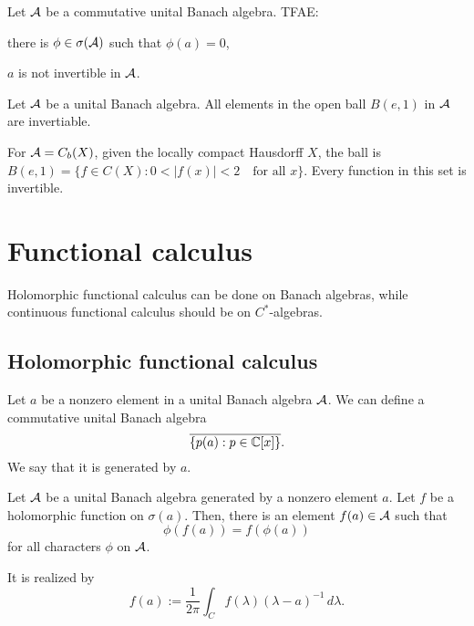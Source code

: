 \documentclass{../crs}
\begin{document}
\begin{cor}
Let $\mathcal{A}$ be a commutative unital Banach algebra.
TFAE:
\begin{cond}
\item there is $\phi\in\sigma(\mathcal{A})$ such that $\phi(a)=0$,
\item $a$ is not invertible in $\mathcal{A}$.
\end{cond}
\end{cor}
\begin{cor}
Let $\mathcal{A}$ be a unital Banach algebra.
All elements in the open ball $B(e,1)$ in $\mathcal{A}$ are invertiable.
\end{cor}
\begin{ex}
For $\mathcal{A}=C_b(X)$, given the locally compact Hausdorff $X$, the ball is $B(e,1)=\{f\in C(X):0<|f(x)|<2\quad\text{for all }x\}$.
Every function in this set is invertible.
\end{ex}


\section{Functional calculus}

Holomorphic functional calculus can be done on Banach algebras, while continuous functional calculus should be on $C^*$-algebras.

\subsection{Holomorphic functional calculus}
Let $a$ be a nonzero element in a unital Banach algebra $\mathcal{A}$.
We can define a commutative unital Banach algebra
\[\overline{\{p(a):p\in\mathbb{C}[x]\}}.\]
We say that it is generated by $a$.

\begin{thm}
Let $\mathcal{A}$ be a unital Banach algebra generated by a nonzero element $a$.
Let $f$ be a holomorphic function on $\sigma(a)$.
Then, there is an element $f(a)\in\mathcal{A}$ such that
\[\phi(f(a))=f(\phi(a))\]
for all characters $\phi$ on $\mathcal{A}$.
\end{thm}
\begin{pf}
It is realized by
\[f(a):=\frac1{2\pi}\int_Cf(\lambda)(\lambda-a)^{-1}\,d\lambda.\]
\end{pf}

\begin{ex}

\end{ex}
\end{document}
